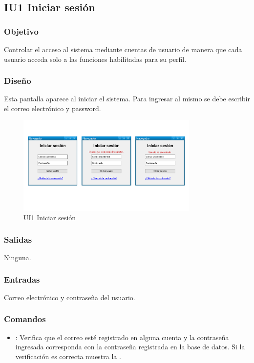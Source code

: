 \subsection{IU1 Iniciar sesión}

\subsubsection{Objetivo}
	Controlar el acceso al sistema mediante cuentas de usuario de manera que cada usuario acceda solo a las funciones habilitadas para su perfil.

\subsubsection{Diseño}
	Esta pantalla aparece al iniciar el sistema. Para ingresar al mismo se debe escribir el correo electrónico y password. 

\begin{figure}[htbp!]
		\centering
			\includegraphics[width=0.8\textwidth]{images/UI1}
		\caption{UI1 Iniciar sesión}
	\end{figure}


\subsubsection{Salidas}
	Ninguna.

\subsubsection{Entradas}
Correo electrónico y contraseña del usuario.

\subsubsection{Comandos}
\begin{itemize}
	\item {}:  Verifica que el correo esté registrado en alguna cuenta y la contraseña ingresada corresponda con la contraseña registrada en la base de datos. Si la verificación es correcta muestra la .	
\end{itemize}

